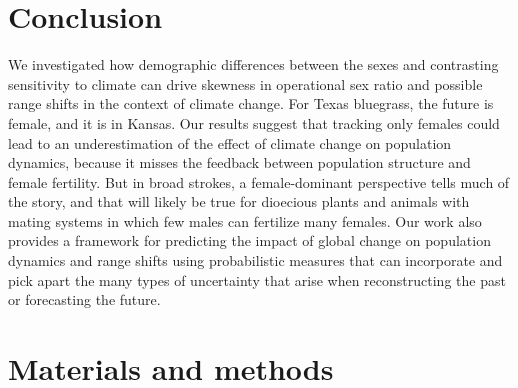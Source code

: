 \documentclass[9pt,twocolumn,twoside,lineno]{pnas-new}
\begin{document}
\section*{Conclusion}
We investigated how demographic differences between the sexes and contrasting sensitivity to climate can drive skewness in operational sex ratio and possible range shifts in the context of climate change. 
For Texas bluegrass, the future is female, and it is in Kansas. 
Our results suggest that tracking only females could lead to an underestimation of the effect of climate change on population dynamics, because it misses the feedback between population structure and female fertility. 
But in broad strokes, a female-dominant perspective tells much of the story, and that will likely be true for dioecious plants and animals with mating systems in which few males can fertilize many females. 
Our work also provides a framework for predicting the impact of global change on population dynamics and range shifts using probabilistic measures that can incorporate and pick apart the many types of uncertainty that arise when reconstructing the past or forecasting the future. 

\section*{Materials and methods}
\end{document}

